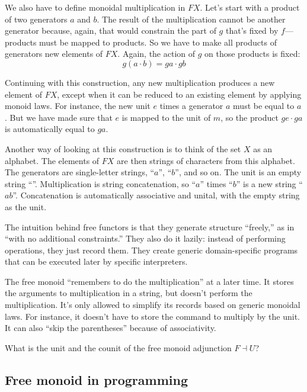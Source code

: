 \documentclass[DaoFP]{subfiles}
\begin{document}
We also have to define monoidal multiplication in $F X$. Let's start with a product of two generators $a$ and $b$. The result of the multiplication cannot be another generator because, again, that would constrain the part of $g$ that's fixed by $f$---products must be mapped to products. So we have to make all products of generators new elements of $F X$. Again, the action of $g$ on those products is fixed:
\[ g (a \cdot b)  = g a \cdot g b\]

Continuing with this construction, any new multiplication produces a new element of $F X$, except when it can be reduced to an existing element by applying monoid laws. For instance, the new unit $e$ times a generator $a$ must be equal to $a$. But we have made sure that $e$ is mapped to the unit of $m$, so the product $g e \cdot g a$ is automatically equal to $g a$.

Another way of looking at this construction is to think of the set $X$ as an alphabet. The elements of $F X$ are then strings of characters from this alphabet. The generators are single-letter strings, ``$a$'', ``$b$'', and so on. The unit is an empty string ``''. Multiplication is string concatenation, so  ``$a$'' times ``$b$'' is a new string ``$ab$''. Concatenation is automatically associative and unital, with the empty string as the unit.

The intuition behind free functors is that they generate structure ``freely,'' as in ``with no additional constraints.'' They also do it lazily: instead of performing operations, they just record them. They create generic domain-specific programs that can be executed later by specific interpreters.

The free monoid ``remembers to do the multiplication'' at a later time. It stores the arguments to multiplication in a string, but doesn't perform the multiplication. It's only allowed to simplify its records based on generic monoidal laws. For instance, it doesn't have to store the command to multiply by the unit. It can also ``skip the parentheses'' because of associativity. 

\begin{exercise}
What is the unit and the counit of the free monoid adjunction $F \dashv U$?
\end{exercise}

\subsection{Free monoid in programming}
\end{document}
